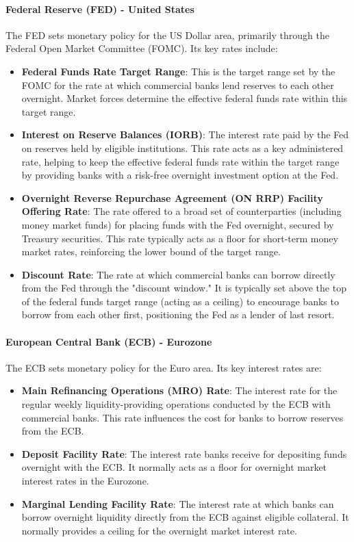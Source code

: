 \paragraph{Federal Reserve (FED) - United States}
The FED sets monetary policy for the US Dollar area, primarily through the Federal Open Market Committee (FOMC). Its key rates include:
\begin{itemize}
    \item \textbf{Federal Funds Rate Target Range}: This is the target range set by the FOMC for the rate at which commercial banks lend reserves to each other overnight. Market forces determine the effective federal funds rate within this target range.
    \item \textbf{Interest on Reserve Balances (IORB)}: The interest rate paid by the Fed on reserves held by eligible institutions. This rate acts as a key administered rate, helping to keep the effective federal funds rate within the target range by providing banks with a risk-free overnight investment option at the Fed.
    \item \textbf{Overnight Reverse Repurchase Agreement (ON RRP) Facility Offering Rate}: The rate offered to a broad set of counterparties (including money market funds) for placing funds with the Fed overnight, secured by Treasury securities. This rate typically acts as a floor for short-term money market rates, reinforcing the lower bound of the target range.
    \item \textbf{Discount Rate}: The rate at which commercial banks can borrow directly from the Fed through the "discount window." It is typically set above the top of the federal funds target range (acting as a ceiling) to encourage banks to borrow from each other first, positioning the Fed as a lender of last resort.
\end{itemize}

\paragraph{European Central Bank (ECB) - Eurozone}
The ECB sets monetary policy for the Euro area. Its key interest rates are:
\begin{itemize}
    \item \textbf{Main Refinancing Operations (MRO) Rate}: The interest rate for the regular weekly liquidity-providing operations conducted by the ECB with commercial banks. This rate influences the cost for banks to borrow reserves from the ECB.
    \item \textbf{Deposit Facility Rate}: The interest rate banks receive for depositing funds overnight with the ECB. It normally acts as a floor for overnight market interest rates in the Eurozone.
    \item \textbf{Marginal Lending Facility Rate}: The interest rate at which banks can borrow overnight liquidity directly from the ECB against eligible collateral. It normally provides a ceiling for the overnight market interest rate.
\end{itemize}

